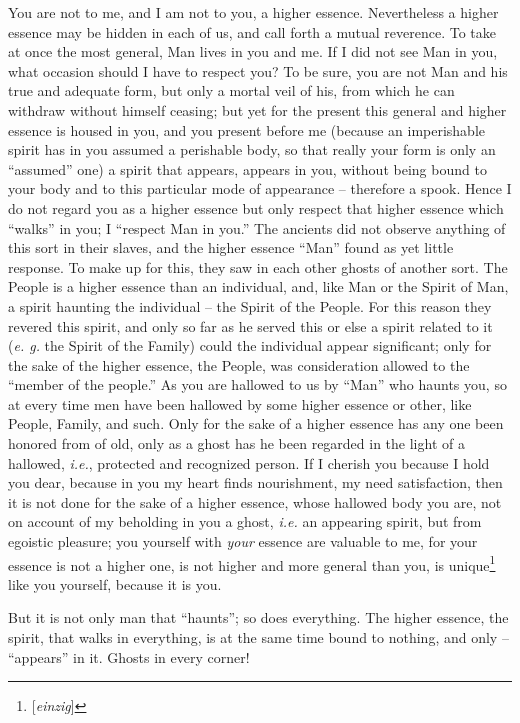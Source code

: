 \documentclass[12pt,a4paper]{book}
\begin{document}
You are not to me, and I am not to you, a higher essence. Nevertheless a 
higher essence may be hidden in each of us, and call forth a mutual reverence. 
To take at once the most general, Man lives in you and me. If I did not see 
Man in you, what occasion should I have to respect you? To be sure, you are 
not Man and his true and adequate form, but only a mortal veil of his, from 
which he can withdraw without himself ceasing; but yet for the present this 
general and higher essence is housed in you, and you present before me 
(because an imperishable spirit has in you assumed a perishable body, so that 
really your form is only an ``assumed'' one) a spirit that appears, appears 
in you, without being bound to your body and to this particular mode of 
appearance -- therefore a spook. Hence I do not regard you as a higher essence 
but only respect that higher essence which ``walks'' in you; I ``respect 
Man in you.'' The ancients did not observe anything of this sort in their 
slaves, and the higher essence ``Man'' found as yet little response. To make 
up for this, they saw in each other ghosts of another sort. The People is a 
higher essence than an individual, and, like Man or the Spirit of Man, a 
spirit haunting the individual -- the Spirit of the People. For this reason 
they revered this spirit, and only so far as he served this or else a spirit 
related to it (\textit{e. g.} the Spirit of the Family) could the individual 
appear significant; only for the sake of the higher essence, the People, was 
consideration allowed to the ``member of the people.'' As you are hallowed 
to us by ``Man'' who haunts you, so at every time men have been hallowed by 
some higher essence or other, like People, Family, and such. Only for the sake 
of a higher essence has any one been honored from of old, only as a ghost has 
he been regarded in the light of a hallowed, \textit{i.e.}, protected and 
recognized person. If I cherish you because I hold you dear, because in you my 
heart finds nourishment, my need satisfaction, then it is not done for the 
sake of a higher essence, whose hallowed body you are, not on account of my 
beholding in you a ghost, \textit{i.e.} an appearing spirit, but from egoistic 
pleasure; you yourself with \textit{your} essence are valuable to me, for your 
essence is not a higher one, is not higher and more general than you, is 
unique\footnote{[\textit{einzig}]} like you yourself, because it is you.

But it is not only man that ``haunts''; so does everything. The higher 
essence, the spirit, that walks in everything, is at the same time bound to 
nothing, and only -- ``appears'' in it. Ghosts in every corner!
\end{document}
